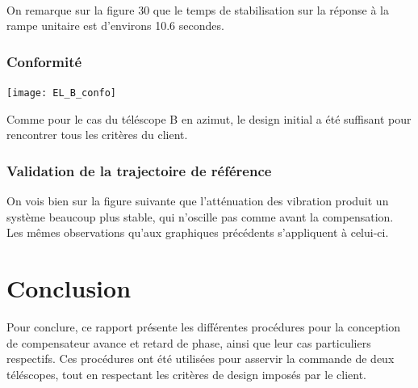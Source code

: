 \documentclass{udes_rapport} %
\begin{document}
\noindent\begin{minipage}{\textwidth}
\begin{minipage}{0.5\textwidth}
\end{minipage} 
\begin{minipage}{0.5\textwidth}
\end{minipage}%

\end{minipage}
\\
On remarque sur la figure 30 que le temps de stabilisation sur la réponse à la rampe unitaire  est d'environs 10.6 secondes. 
\subsubsection{Conformité}
\begin{center}
  \label{tab:conformite_B_EL}
  \texttt{[image: EL\_B\_confo]}
\end{center}
Comme pour le cas du téléscope B en azimut, le design initial a été suffisant pour rencontrer tous les critères du client.
\subsubsection{Validation de la trajectoire de référence}

On vois bien sur la figure suivante que l'atténuation des vibration produit un système beaucoup plus stable, qui n'oscille pas comme avant la compensation. Les mêmes observations qu'aux graphiques précédents s'appliquent à celui-ci.


\section{Conclusion}
Pour conclure, ce rapport présente les différentes procédures pour la conception de compensateur avance et retard de phase, ainsi que leur cas particuliers respectifs. Ces procédures ont été utilisées pour asservir la commande de deux téléscopes, tout en respectant les critères de design imposés par le client.
\end{document}
